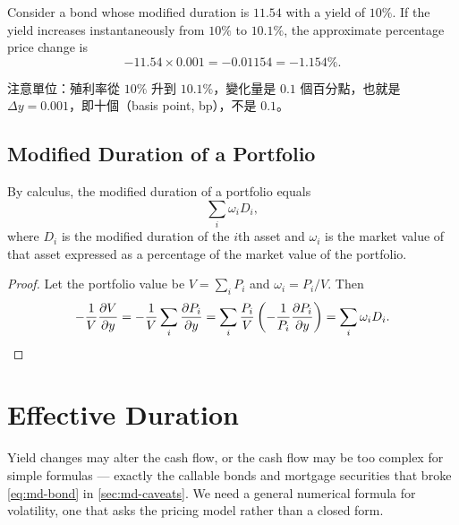 \begin{eg}
	Consider a bond whose modified duration is $11.54$ with a yield of $10\%$.
	If the yield increases instantaneously from $10\%$ to $10.1\%$, the approximate percentage price change is
	\[
		-11.54 \times 0.001 = -0.01154 = -1.154\% .
	\]
\end{eg}

\suppstart
\begin{remark}
	注意單位：殖利率從 $10\%$ 升到 $10.1\%$，變化量是 $0.1$ 個百分點，也就是 $\Delta y = 0.001$，即十個（basis point, bp），不是 $0.1$。
\end{remark}
\suppend

\subsection{Modified Duration of a Portfolio}
\label{sec:portfolio-duration}


\begin{proposition}
	By calculus, the modified duration of a portfolio equals
	\begin{equation}
		\sum_{i}\omega_{i}D_{i} , \label{eq:portfolio-dur}
	\end{equation}
	where $D_{i}$ is the modified duration of the $i$th asset and $\omega_{i}$ is the market value of that asset expressed as a percentage of the market value of the portfolio.
\end{proposition}

\suppstart
\begin{proof}
	Let the portfolio value be $V=\sum_{i}P_{i}$ and $\omega_{i}=P_{i}/V$. Then
	\[
		-\frac{1}{V}\frac{\partial V}{\partial y}
		= -\frac{1}{V}\sum_{i}\frac{\partial P_{i}}{\partial y}
		= \sum_{i}\frac{P_{i}}{V}\left(-\frac{1}{P_{i}}\frac{\partial P_{i}}{\partial y}\right)
		= \sum_{i}\omega_{i}D_{i} . \qedhere
	\]
\end{proof}
\suppend

\section{Effective Duration}


Yield changes may alter the cash flow, or the cash flow may be too complex for simple formulas --- exactly the callable bonds and mortgage securities that broke \eqref{eq:md-bond} in \autoref{sec:md-caveats}.
We need a general numerical formula for volatility, one that asks the pricing model rather than a closed form.

